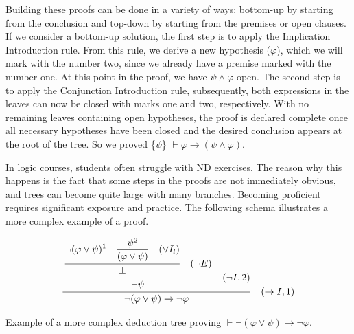 Building these proofs can be done in a variety of ways: bottom-up by starting from the conclusion and top-down by starting from the premises or open clauses. If we consider a bottom-up solution, the first step is to apply the Implication Introduction rule. From this rule, we derive a new hypothesis (\(\varphi\)), which we will mark with the number two, since we already have a premise marked with the number one. At this point in the proof, we have \(\displaystyle \psi \land \varphi\) open. The second step is to apply the Conjunction Introduction rule, subsequently, both expressions in the leaves can now be closed with marks one and two, respectively. With no remaining leaves containing open hypotheses, the proof is declared complete once all necessary hypotheses have been closed and the desired conclusion appears at the root of the tree. So we proved \{\(\psi\)\} \( \vdash \varphi \to (\psi \land \varphi) \).

In logic courses, students often struggle with \gls{ND} exercises. The reason why this happens is the fact that some steps in the proofs are not immediately obvious, and trees can become quite large with many branches. Becoming proficient requires significant exposure and practice. The following schema illustrates a more complex example of a proof.
\begin{table}[h!]
    \centering
    \[
    \frac{\displaystyle \frac{\displaystyle \frac{
    \displaystyle \neg (\varphi \lor \psi)^1 \quad \displaystyle \frac{\psi^2}{(\varphi \lor \psi) \strut} \quad (\lor I_l) \strut}
    {\displaystyle \bot \strut} \quad (\displaystyle \neg E)\strut} {\displaystyle \neg \psi \strut} \quad (\neg I, 2) \strut}
    {\neg (\varphi \lor \psi) \to \neg \varphi \strut} \quad (\to I, 1)
    \]
    \caption{Example of a more complex deduction tree proving \( \vdash \neg (\varphi \lor \psi) \to \neg \varphi \).}
    \label{tab:proof-tree1}
\end{table}
    



